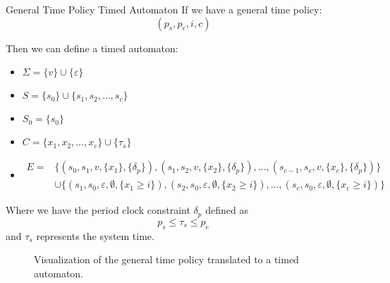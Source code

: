 \begin{definition}{General \thelang{} Time Policy Timed Automaton}
  If we have a general time policy:
  \[(p_s, p_e, i, c)\]

  Then we can define a timed automaton:

  \begin{itemize}
    \item $\Sigma = \{ v \} \cup \{ \varepsilon \}$
    \item $S = \{ s_0 \} \cup \{ s_1, s_2, \dots, s_c \}$
    \item $S_0 = \{ s_0 \}$
    \item $C = \{ x_1, x_2, \dots, x_c \} \cup \{ \tau_s \}$
    \item $\begin{aligned}E =& \{ (s_0, s_1, v, \{ x_1 \}, \{ \delta_p \}), (s_1, s_2, v, \{ x_2 \}, \{ \delta_p \}), \dots, (s_{c-1}, s_c, v, \{ x_c \}, \{ \delta_p \})\} \\ &\cup \{ (s_1, s_0, \varepsilon, \emptyset, \{ x_1 \geq i \}), (s_2, s_0, \varepsilon, \emptyset, \{ x_2 \geq i \}), \dots, (s_c, s_0, \varepsilon, \emptyset, \{ x_c \geq i \}) \}\end{aligned}$
  \end{itemize}

  Where we have the period clock constraint $\delta_p$ defined as \[p_s \leq \tau_s \leq p_e\]
  and $\tau_s$ represents the system time.
\end{definition}

\begin{figure}[h]
  \resizebox{\linewidth}{!}{}
  \caption{Visualization of the general \thelang{} time policy translated to a timed automaton.}
  \label{time:fig:generaltimedautomata}
\end{figure}
